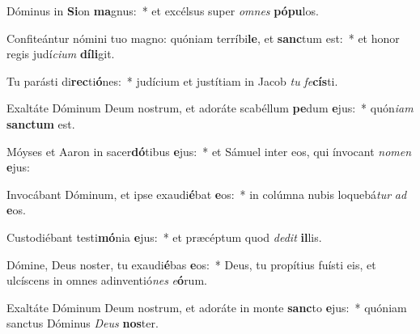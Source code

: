 \item Dóminus in \textbf{Si}on \textbf{ma}gnus:~* et excélsus super \textit{om}\textit{nes} \textbf{pó}\textbf{pu}los.
\item Confiteántur nómini tuo magno: quóniam terríbi\textbf{le}, et \textbf{sanc}tum est:~* et honor regis judí\textit{ci}\textit{um} \textbf{dí}\textbf{li}git.
\item Tu parásti di\textbf{rec}ti\textbf{ó}nes:~* judícium et justítiam in Jacob \textit{tu} \textit{fe}\textbf{cís}ti.
\item Exaltáte Dóminum Deum nostrum, et adoráte scabéllum \textbf{pe}dum \textbf{e}jus:~* quón\textit{i}\textit{am} \textbf{sanc}\textbf{tum} est.
\item Móyses et Aaron in sacer\textbf{dó}tibus \textbf{e}jus:~* et Sámuel inter eos, qui ínvocant \textit{no}\textit{men} \textbf{e}jus:
\item Invocábant Dóminum, et ipse exaudi\textbf{é}bat \textbf{e}os:~* in colúmna nubis loquebá\textit{tur} \textit{ad} \textbf{e}os.
\item Custodiébant testi\textbf{mó}nia \textbf{e}jus:~* et præcéptum quod \textit{de}\textit{dit} \textbf{il}lis.
\item Dómine, Deus noster, tu exaudi\textbf{é}bas \textbf{e}os:~* Deus, tu propítius fuísti eis, et ulcíscens in omnes adinventió\textit{nes} \textit{e}\textbf{ó}rum.
\item Exaltáte Dóminum Deum nostrum, et adoráte in monte \textbf{sanc}to \textbf{e}jus:~* quóniam sanctus Dóminus \textit{De}\textit{us} \textbf{nos}ter.

